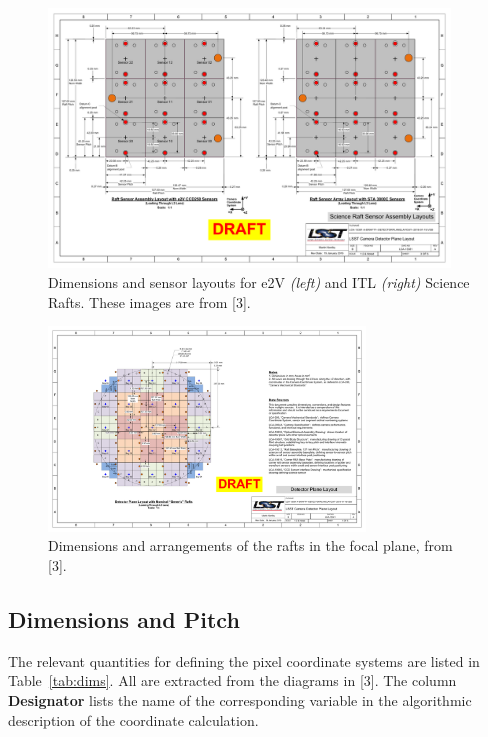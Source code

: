 \documentclass{article}[12pt]
\begin{document}
{\begin{figure}
\centering
    \includegraphics[width=0.95\textwidth]{raft_layout.pdf}
    \caption{Dimensions and sensor layouts for e2V {\it (left)} and ITL {\it (right)} Science Rafts.  These images are from [3].}
    \label{fig:raft}
\end{figure}

\begin{figure}
\centering
    \includegraphics[width=0.75\textwidth]{focal_plane_layout.pdf}
    \caption{Dimensions and arrangements of the rafts in the focal plane, from [3].}
    \label{fig:focalplane}
\end{figure}

\subsection{Dimensions and Pitch}
The relevant quantities for defining the pixel coordinate systems are listed in Table~\ref{tab:dims}.  All are extracted from the diagrams in [3].  The column {\bf Designator} lists the name of the corresponding variable in the algorithmic description of the coordinate calculation.  

}
\end{document}
